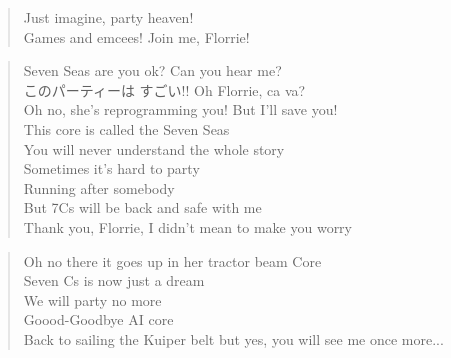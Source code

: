 \begin{verse}
Just imagine, party heaven! \\
Games and emcees! Join me, Florrie!
\end{verse}

\clearpage
{}

\begin{verse}
Seven Seas are you ok? Can you hear me? \\
このパーティーは すごい!! Oh Florrie, ca va?  \\
Oh no, she's reprogramming you! But I'll save you! \\
This core is called the Seven Seas  \\
You will never understand the whole story \\
Sometimes it's hard to party \\
Running after somebody \\
But 7Cs will be back and safe with me \\
Thank you, Florrie, I didn’t mean to make you worry 
\end{verse}

\begin{verse}
Oh no there it goes up in her tractor beam Core \\
Seven Cs is now just a dream \\
We will party no more \\
Goood-Goodbye AI core \\
Back to sailing the Kuiper belt but yes, you will see me once more... 
\end{verse}

\clearpage
